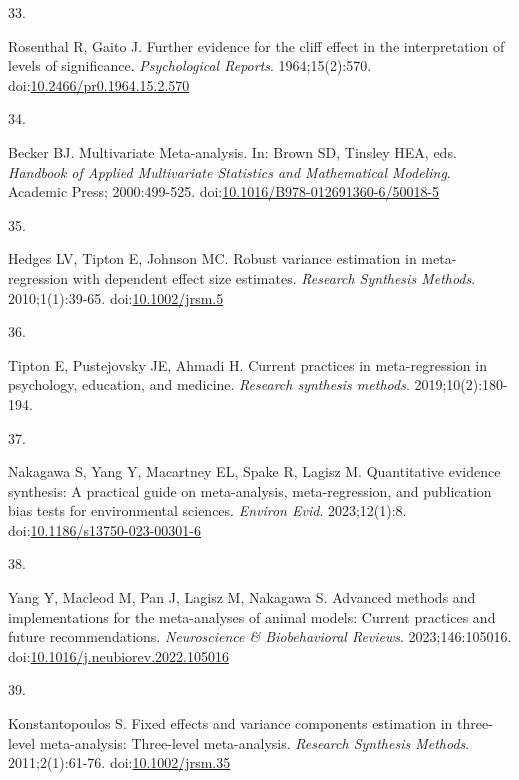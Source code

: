 \documentclass[
  man, donotrepeattitle,floatsintext]{apa7}
\newlength{\cslhangindent}
\newlength{\csllabelwidth}
\newenvironment{CSLReferences}[2] %
 {\begin{list}{}{%
  \setlength{\itemindent}{0pt}
  \setlength{\leftmargin}{0pt}
  \setlength{\parsep}{0pt}
  \ifodd #1
   \setlength{\leftmargin}{\cslhangindent}
   \setlength{\itemindent}{-1\cslhangindent}
  \fi
  \setlength{\itemsep}{#2\baselineskip}}}
 {\end{list}}
\newcommand{\CSLLeftMargin}[1]{\parbox[t]{\csllabelwidth}{\strut#1\strut}}
\newcommand{\CSLRightInline}[1]{\parbox[t]{\linewidth - \csllabelwidth}{\strut#1\strut}}
\begin{document}
\begin{CSLReferences}{0}{1}
\CSLLeftMargin{33. }%
\CSLRightInline{Rosenthal R, Gaito J. Further evidence for the cliff effect in the interpretation of levels of significance. \emph{Psychological Reports}. 1964;15(2):570. doi:\href{https://doi.org/10.2466/pr0.1964.15.2.570}{10.2466/pr0.1964.15.2.570}}

\CSLLeftMargin{34. }%
\CSLRightInline{Becker BJ. {Multivariate Meta-analysis}. In: Brown SD, Tinsley HEA, eds. \emph{Handbook of Applied Multivariate Statistics and Mathematical Modeling}. Academic Press; 2000:499-525. doi:\href{https://doi.org/10.1016/B978-012691360-6/50018-5}{10.1016/B978-012691360-6/50018-5}}

\CSLLeftMargin{35. }%
\CSLRightInline{Hedges LV, Tipton E, Johnson MC. {Robust variance estimation in meta-regression with dependent effect size estimates}. \emph{Research Synthesis Methods}. 2010;1(1):39-65. doi:\href{https://doi.org/10.1002/jrsm.5}{10.1002/jrsm.5}}

\CSLLeftMargin{36. }%
\CSLRightInline{Tipton E, Pustejovsky JE, Ahmadi H. Current practices in meta-regression in psychology, education, and medicine. \emph{Research synthesis methods}. 2019;10(2):180-194.}

\CSLLeftMargin{37. }%
\CSLRightInline{Nakagawa S, Yang Y, Macartney EL, Spake R, Lagisz M. Quantitative evidence synthesis: A practical guide on meta-analysis, meta-regression, and publication bias tests for environmental sciences. \emph{Environ Evid}. 2023;12(1):8. doi:\href{https://doi.org/10.1186/s13750-023-00301-6}{10.1186/s13750-023-00301-6}}

\CSLLeftMargin{38. }%
\CSLRightInline{Yang Y, Macleod M, Pan J, Lagisz M, Nakagawa S. Advanced methods and implementations for the meta-analyses of animal models: {Current} practices and future recommendations. \emph{Neuroscience \& Biobehavioral Reviews}. 2023;146:105016. doi:\href{https://doi.org/10.1016/j.neubiorev.2022.105016}{10.1016/j.neubiorev.2022.105016}}

\CSLLeftMargin{39. }%
\CSLRightInline{Konstantopoulos S. Fixed effects and variance components estimation in three-level meta-analysis: {Three}-level meta-analysis. \emph{Research Synthesis Methods}. 2011;2(1):61-76. doi:\href{https://doi.org/10.1002/jrsm.35}{10.1002/jrsm.35}}


\end{CSLReferences}
\end{document}
